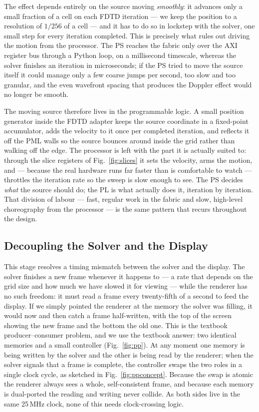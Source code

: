 \documentclass[11pt]{article}
\begin{document}
The effect depends entirely on the source moving \emph{smoothly}: it advances
only a small fraction of a cell on each FDTD iteration --- we keep the position
to a resolution of $1/256$ of a cell --- and it has to do so in lockstep with
the solver, one small step for every iteration completed. This is precisely what
rules out driving the motion from the processor. The PS reaches the fabric only
over the AXI register bus through a Python loop, on a millisecond timescale,
whereas the solver finishes an iteration in microseconds; if the PS tried to
move the source itself it could manage only a few coarse jumps per second, too
slow and too granular, and the even wavefront spacing that produces the Doppler
effect would no longer be smooth.

The moving source therefore lives in the programmable logic. A small position
generator inside the FDTD adapter keeps the source coordinate in a fixed-point
accumulator, adds the velocity to it once per completed iteration, and reflects
it off the PML walls so the source bounces around inside the grid rather than
walking off the edge. The processor is left with the part it is actually suited
to: through the slice registers of Fig.~\ref{fig:slices} it sets the velocity,
arms the motion, and --- because the real hardware runs far faster than is
comfortable to watch --- throttles the iteration rate so the sweep is slow
enough to see. The PS decides \emph{what} the source should do; the PL is what
actually does it, iteration by iteration. That division of labour --- fast,
regular work in the fabric and slow, high-level choreography from the processor
--- is the same pattern that recurs throughout the design.

\subsection{Decoupling the Solver and the Display}

This stage resolves a timing mismatch between the solver and the display. The
solver finishes a new frame whenever it happens to --- a rate that depends on the
grid size and how much we have slowed it for viewing --- while the renderer has
no such freedom: it must read a frame every twenty-fifth of a second to feed the
display. If we simply pointed the
renderer at the memory the solver was filling, it would now and then catch a
frame half-written, with the top of the screen showing the new frame and the
bottom the old one. This is the textbook producer--consumer problem, and we use
the textbook answer: two identical memories and a small controller
(Fig.~\ref{fig:pp}). At any moment one memory is being written by the solver and
the other is being read by the renderer; when the solver signals that a frame is
complete, the controller swaps the two roles in a single clock cycle, as
sketched in Fig.~\ref{fig:ppconcept}. Because the swap is atomic the renderer
always sees a whole, self-consistent frame, and because each memory is
dual-ported the reading and writing never collide. As both sides live in the
same 25\,MHz clock, none of this needs clock-crossing logic.
\end{document}

